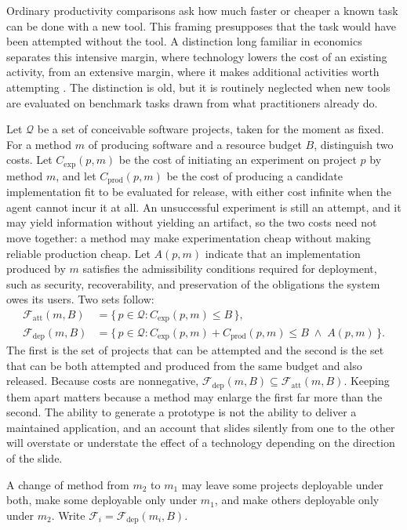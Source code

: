 \documentclass[11pt]{article}
\theoremstyle{remark}
\newcommand{\Q}{\mathcal{Q}}
\newcommand{\F}{\mathcal{F}}
\begin{document}
Ordinary productivity comparisons ask how much faster or cheaper a known task can be done with a new tool. This framing presupposes that the task would have been attempted without the tool. A distinction long familiar in economics separates this intensive margin, where technology lowers the cost of an existing activity, from an extensive margin, where it makes additional activities worth attempting \cite{romer1990,weitzman1998}. The distinction is old, but it is routinely neglected when new tools are evaluated on benchmark tasks drawn from what practitioners already do.

Let $\Q$ be a set of conceivable software projects, taken for the moment as fixed. For a method $m$ of producing software and a resource budget $B$, distinguish two costs. Let $C_{\mathrm{exp}}(p,m)$ be the cost of initiating an experiment on project $p$ by method $m$, and let $C_{\mathrm{prod}}(p,m)$ be the cost of producing a candidate implementation fit to be evaluated for release, with either cost infinite when the agent cannot incur it at all. An unsuccessful experiment is still an attempt, and it may yield information without yielding an artifact, so the two costs need not move together: a method may make experimentation cheap without making reliable production cheap. Let $A(p,m)$ indicate that an implementation produced by $m$ satisfies the admissibility conditions required for deployment, such as security, recoverability, and preservation of the obligations the system owes its users. Two sets follow:
\begin{align*}
\F_{\mathrm{att}}(m,B)&=\{\,p\in\Q : C_{\mathrm{exp}}(p,m)\le B\,\},\\
\F_{\mathrm{dep}}(m,B)&=\{\,p\in\Q : C_{\mathrm{exp}}(p,m)+C_{\mathrm{prod}}(p,m)\le B \;\wedge\; A(p,m)\,\}.
\end{align*}
The first is the set of projects that can be attempted and the second is the set that can be both attempted and produced from the same budget and also released. Because costs are nonnegative, $\F_{\mathrm{dep}}(m,B)\subseteq\F_{\mathrm{att}}(m,B)$. Keeping them apart matters because a method may enlarge the first far more than the second. The ability to generate a prototype is not the ability to deliver a maintained application, and an account that slides silently from one to the other will overstate or understate the effect of a technology depending on the direction of the slide.

A change of method from $m_2$ to $m_1$ may leave some projects deployable under both, make some deployable only under $m_1$, and make others deployable only under $m_2$. Write $\F_i=\F_{\mathrm{dep}}(m_i,B)$.
\end{document}

